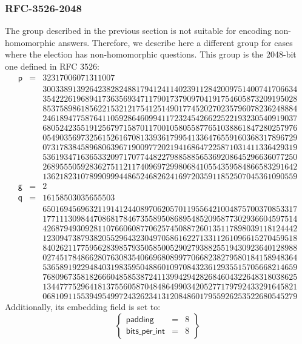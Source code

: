 \documentclass[a4paper]{article}
\begin{document}
\subsubsection{RFC-3526-2048}
\label{nh-group}

The group described in the previous section is not suitable for
encoding non-homomorphic answers. Therefore, we describe here a
different group for cases where the election has non-homomorphic
questions. This group is the 2048-bit one defined in RFC 3526:
\[
\begin{array}{lcr}
\textsf{p}&=&32317006071311007\\
&&300338913926423828248817941241140239112842009751400741706634\\
&&354222619689417363569347117901737909704191754605873209195028\\
&&853758986185622153212175412514901774520270235796078236248884\\
&&246189477587641105928646099411723245426622522193230540919037\\
&&680524235519125679715870117001058055877651038861847280257976\\
&&054903569732561526167081339361799541336476559160368317896729\\
&&073178384589680639671900977202194168647225871031411336429319\\
&&536193471636533209717077448227988588565369208645296636077250\\
&&268955505928362751121174096972998068410554359584866583291642\\
&&136218231078990999448652468262416972035911852507045361090559\\
\textsf{g}&=&2\\
\textsf{q}&=&16158503035655503\\
&&650169456963211914124408970620570119556421004875700370853317\\
&&177111309844708681784673558950868954852095877302936604597514\\
&&426879493092811076606087706257450887260135117898039118124442\\
&&123094738793820552964323049705861622713311261096615270459518\\
&&840262117759562839857935058500529027938825519430923640128988\\
&&027451784866280763083540669680899770668238279580184158948364\\
&&536589192294840319835950488601097084323612935515705668214659\\
&&768096735818266604858538724113994294282684604322648318038625\\
&&134477752964181375560587048486499034205277179792433291645821\\
&&068109115539495499724326234131208486017955926253522680545279
\end{array}
\]
Additionally, its \textsf{embedding} field is set to:
\[
  \left\{
    \begin{array}{rcl}
      \textsf{padding}&=&8\\
      \textsf{bits\_per\_int}&=&8
    \end{array}
  \right\}
\]
\end{document}
